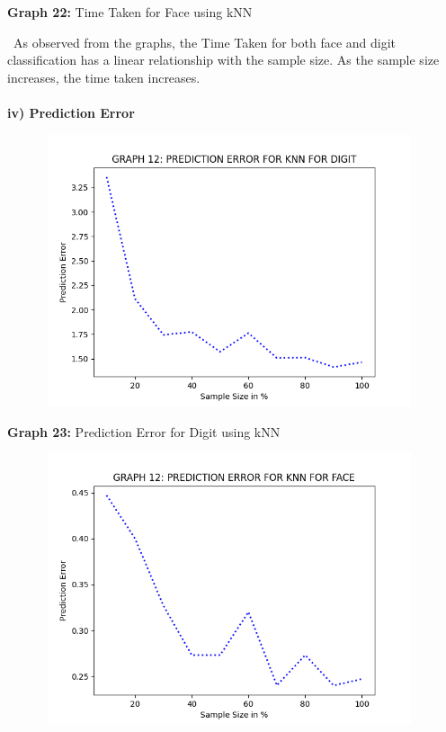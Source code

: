 \documentclass[10 pt]{report}   	%
\begin{document}
{{\begin{center}
\small \textbf {Graph 22:} Time Taken for Face using kNN\\
\end{center}
\textbullet\ As observed from the graphs, the Time Taken for both face and digit classification has a linear relationship with the sample size. As the sample size increases, the time taken increases.\\ \\
\textbf{iv) Prediction Error}
\begin{figure} [H]
\includegraphics [width = 11cm, height = 8cm]{KNN_PRED_DIGIT.png}
\end {figure}
\begin{center}
\small \textbf {Graph 23:} Prediction Error for Digit using kNN\\
\end{center}
\begin{figure} [H]
\includegraphics [width = 11cm, height = 8cm]{KNN_PRED_FACE.png}
\end {figure}
\begin{center}

\end{center}}}
\end{document}
